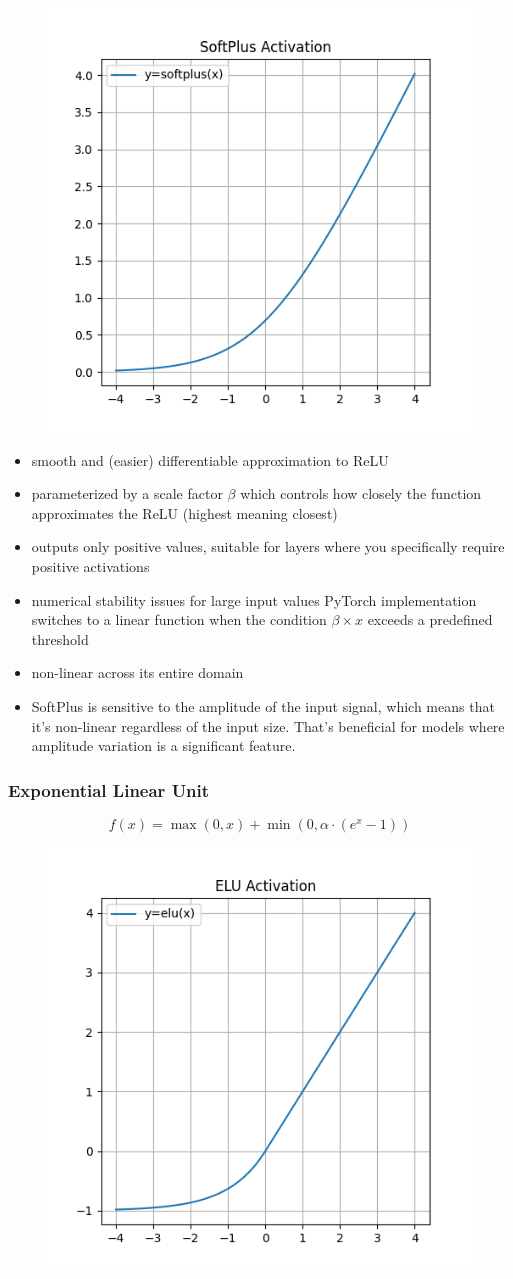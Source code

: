 \documentclass[11pt]{article}
\begin{document}
\begin{figure}[H]
    \centering
    \includegraphics*[width=.4\linewidth]{figures/SoftPlus Activation.png}\label{fig:softplus}
\end{figure}

\begin{itemize}
    \item smooth and (easier) differentiable approximation to ReLU
    \item parameterized by a scale factor $\beta$ which controls how closely the function approximates the ReLU (highest meaning closest)
    \item outputs only positive values, suitable for layers where you specifically require positive activations
    \item numerical stability issues for large input values PyTorch implementation switches to a linear function when the condition $\beta \times x$ exceeds a predefined threshold
    \item non-linear across its entire domain
    \item SoftPlus is sensitive to the amplitude of the input signal, which means that it's non-linear regardless of the input size. That's beneficial for models where amplitude variation is a significant  feature.
\end{itemize}

\subsubsection{Exponential Linear Unit}

\begin{definition}\label{eq:activation-elu}
    \begin{equation*}
        f(x) = \max(0,x) + \min(0,\alpha \cdot (e^x - 1))
    \end{equation*}
\end{definition}

\begin{figure}[H]
    \centering
    \includegraphics*[width=.4\linewidth]{figures/ELU Activation.png}\label{fig:elu}
\end{figure}
\end{document}
